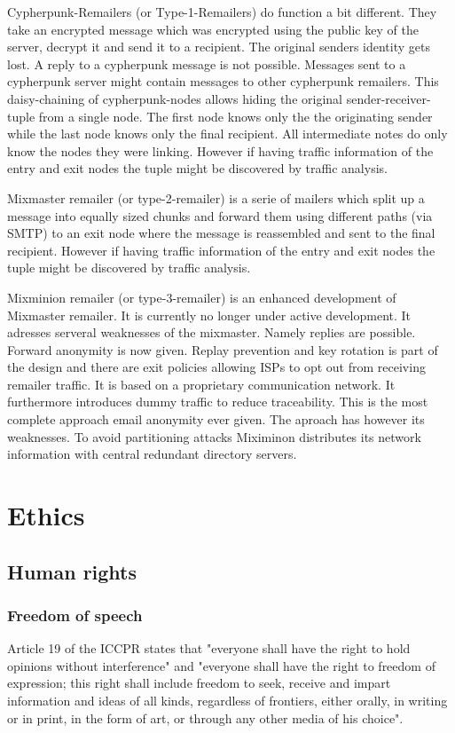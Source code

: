 Cypherpunk-Remailers (or Type-1-Remailers) do function a bit different. They take an encrypted message which was encrypted using the public key of the server, decrypt it and send it to a recipient. The original senders identity gets lost. A reply to a cypherpunk message is not possible. Messages sent to a cypherpunk server might contain messages to other cypherpunk remailers. This daisy-chaining of cypherpunk-nodes allows hiding the original sender-receiver-tuple from a single node. The first node knows only the the originating sender while the last node knows only the final recipient. All intermediate notes do only know the nodes they were linking. However if having traffic information of the entry and exit nodes the tuple might be discovered by traffic analysis.\par

Mixmaster remailer (or type-2-remailer) is a serie of mailers which split up a message into equally sized chunks and forward them using different paths (via SMTP) to an exit node where the message is reassembled and sent to the final recipient. However if having traffic information of the entry and exit nodes the tuple might be discovered by traffic analysis.\par

Mixminion remailer (or type-3-remailer) is an enhanced development of Mixmaster remailer. It is currently no longer under active development. It adresses serveral weaknesses of the mixmaster. Namely replies are possible. Forward anonymity is now given. Replay prevention and key rotation is part of the design and there are exit policies allowing ISPs to opt out from receiving remailer traffic. It is based on a proprietary communication network. It furthermore introduces dummy traffic to reduce traceability. This is the most complete approach email anonymity ever given. The aproach has however its weaknesses. To avoid partitioning attacks Miximinon distributes its network information with central redundant directory servers.\par

\section{Ethics}
\subsection{Human rights}
\subsubsection{Freedom of speech}
Article 19 of the ICCPR states that "everyone shall have the right to hold opinions without interference" and "everyone shall have the right to freedom of expression; this right shall include freedom to seek, receive and impart information and ideas of all kinds, regardless of frontiers, either orally, in writing or in print, in the form of art, or through any other media of his choice".

